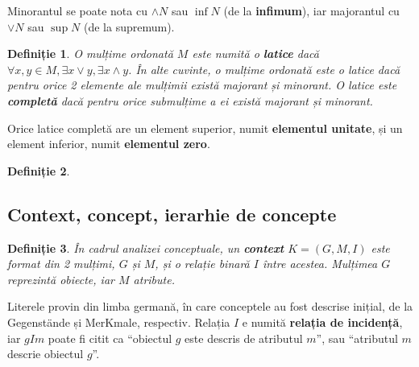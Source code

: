 \documentclass[12pt, a4paper, twoside, romanian]{teza-upb}
\newtheorem{defn}{Definiție}
\begin{document}
    Minorantul se poate nota cu $\wedge N$ sau $\inf N$ (de la \textbf{infimum}), iar majorantul cu $\vee N$ sau $\sup N$ (de la supremum).

    \begin{defn}
      O mulțime ordonată $M$ este numită o \textbf{latice} dacă $\forall x,y \in M, \exists x \vee y, \exists x \wedge y$. În alte cuvinte, o mulțime ordonată este o latice dacă pentru orice 2 elemente
      ale mulțimii există majorant și minorant. O latice este \textbf{completă} dacă pentru orice submulțime a ei există majorant și minorant.
    \end{defn}

    Orice latice completă are un element superior, numit \textbf{elementul unitate}, și un element inferior, numit \textbf{elementul zero}.

    \begin{defn}
    \end{defn}

    \subsection{Context, concept, ierarhie de concepte}
    \begin{defn}
      În cadrul analizei conceptuale, un \textbf{context} $K = (G, M, I)$ este format din 2 mulțimi, $G$ și $M$, și o relație binară $I$ între acestea. Mulțimea $G$ reprezintă obiecte, iar $M$ atribute.
    \end{defn}

      Literele provin din limba germană, în care conceptele au fost descrise inițial, de la Gegenstände și MerKmale, respectiv. Relația $I$ e numită \textbf{relația de incidență}, iar $gIm$ poate fi citit ca ``obiectul $g$ este descris de atributul $m$'', sau ``atributul $m$ descrie obiectul $g$''.
\end{document}
